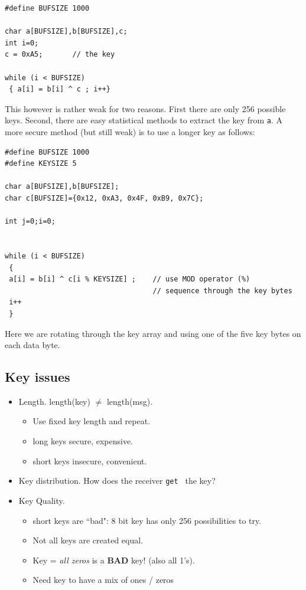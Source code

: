 \begin{verbatim}
#define BUFSIZE 1000

char a[BUFSIZE],b[BUFSIZE],c;
int i=0;
c = 0xA5;       // the key

while (i < BUFSIZE)
 { a[i] = b[i] ^ c ; i++}
\end{verbatim}
This however is rather weak for two reasons.  First there are
only 256 possible keys. Second, there are easy statistical methods
to extract the key from {\tt a}.   A more secure method (but still
 weak)
is to use a longer key as follows:


\begin{verbatim}
#define BUFSIZE 1000
#define KEYSIZE 5

char a[BUFSIZE],b[BUFSIZE];
char c[BUFSIZE]={0x12, 0xA3, 0x4F, 0xB9, 0x7C};

int j=0;i=0;


while (i < BUFSIZE)
 {
 a[i] = b[i] ^ c[i % KEYSIZE] ;    // use MOD operator (%)
                                   // sequence through the key bytes
 i++
 }
\end{verbatim}
Here we are rotating through the key array and using one of the five
 key bytes on each data byte.


\subsection{Key issues}
\begin{itemize}
	\item Length.  length(key) $\ne$ length(msg).
        \begin{itemize}
        	\item Use fixed key length and repeat.
                \item long keys secure, expensive.
                \item short keys insecure, convenient.
         \end{itemize}

         \item Key distribution.  How does the receiver
         {\tt get } the key?

         \item Key Quality.
         \begin{itemize}
                \item short keys are ``bad":   
8 bit key has only 256 possibilities to try.	%
         	\item Not all keys are created equal.
                \item Key = {\it all zeros} is a {\bf BAD} key!
                (also all 1's).
                \item Need key to have a mix of ones / zeros
 
          \end{itemize}
  \end{itemize}


